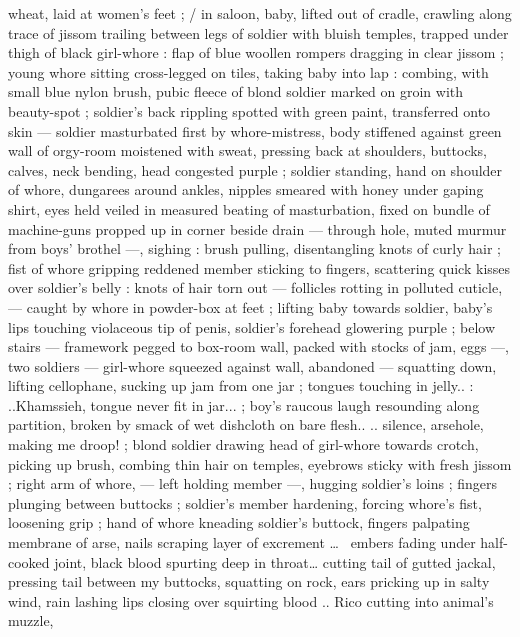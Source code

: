 \documentclass[10pt,twoside]{memoir}
\begin{document}
wheat, laid at women's feet ; / in saloon, baby, lifted out of cradle, 
crawling along trace of jissom trailing between legs of soldier with 
bluish temples, trapped under thigh of black girl-whore : flap of blue 
woollen rompers dragging in clear jissom ; young whore sitting 
cross-legged on tiles, taking baby into lap : combing, with small blue 
nylon brush, pubic fleece of blond soldier marked on groin with 
beauty-spot ; soldier's back rippling spotted with green paint, 
transferred onto skin --- soldier masturbated first by whore-mistress, 
body stiffened against green wall of orgy-room moistened with 
sweat, pressing back at shoulders, buttocks, calves, neck bending, 
head congested purple ; soldier standing, hand on shoulder of 
whore, dungarees around ankles, nipples smeared with honey under 
gaping shirt, eyes held veiled in measured beating of masturbation, 
fixed on bundle of machine-guns propped up in corner beside drain 
--- through hole, muted murmur from boys' brothel ---, sighing : 
brush pulling, disentangling knots of curly hair ; fist of whore 
gripping reddened member sticking to fingers, scattering quick 
kisses over soldier's belly : knots of hair torn out --- follicles rotting 
in polluted cuticle, --- caught by whore in powder-box at feet ; lifting 
baby towards soldier, baby's lips touching violaceous tip of penis, 
soldier's forehead glowering purple ; below stairs --- framework 
pegged to box-room wall, packed with stocks of jam, eggs ---, two 
soldiers --- girl-whore squeezed against wall, abandoned --- 
squatting down, lifting cellophane, sucking up jam from one jar ; 
tongues touching in jelly.{\thinspace}. : {\gl}..Khamssieh, tongue never fit in jar... {\gr} ; 
boy's raucous laugh resounding along partition, broken by smack of 
wet dishcloth on bare flesh.{\thinspace}. {\gl} .. silence, arsehole, making me %
droop!{\gr} ; blond soldier drawing head of girl-whore towards crotch, 
picking up brush, combing thin hair on temples, eyebrows sticky with 
fresh jissom ; right arm of whore, --- left holding member ---, 
hugging soldier's loins ; fingers plunging between buttocks ; 
soldier's member hardening, forcing whore's fist, loosening grip ; 
hand of whore kneading soldier's buttock, fingers palpating 
membrane of arse, nails scraping layer of excrement \ldots\ {\gl} embers 
fading under half-cooked joint, black blood spurting deep in throat\ldots
cutting tail of gutted jackal, pressing tail between my buttocks, 
squatting on rock, ears pricking up in salty wind, rain lashing lips 
closing over squirting blood .. Rico cutting into animal's muzzle, 
\end{document}
